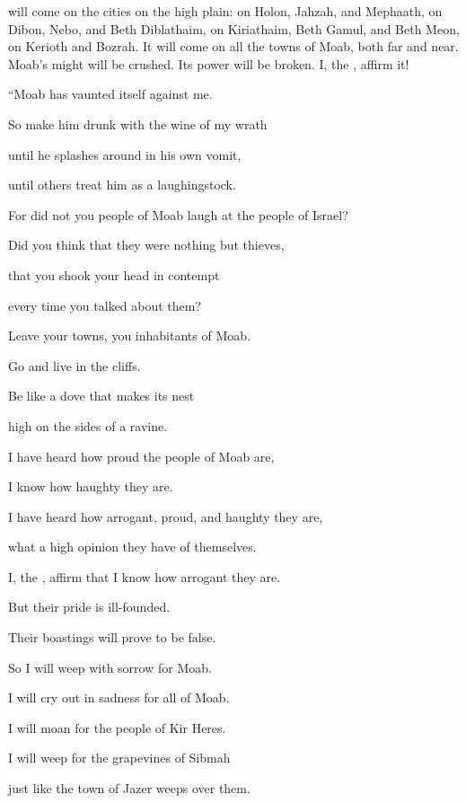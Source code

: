 {will come
on
the cities on the high plain: on Holon,
Jahzah,
and Mephaath,
on
Dibon,
Nebo,
and Beth Diblathaim,
on
Kiriathaim,
Beth Gamul,
and Beth Meon,
on
Kerioth
and Bozrah.
It will come on
all
the towns
of Moab,
both far
and near.
Moab’s
might will be crushed.
Its
power
will be broken.
I, the
{}, affirm it!
\par }{\Q {}“Moab
has vaunted
itself against
me.
\par }{\Q So make him drunk with the wine of my wrath
\par }{\Q until he splashes
around in his own vomit,
\par }{\Q until others treat him as
a laughingstock.
\par }{\Q {}For did not
you people of Moab laugh
at the people of Israel?
\par }{\Q Did you think that they were nothing but thieves,

\par }{\Q that
you shook your head in contempt
\par }{\Q every time you talked about them?
\par }{\Q {}Leave
your towns,
you inhabitants
of Moab.
\par }{\Q Go
and live
in the cliffs.
\par }{\Q Be
like a dove
that makes its nest
\par }{\Q high
on
the sides
of a ravine.
\par }{\Q {}I have heard
how proud
the people of Moab
are,
\par }{\Q I know how
haughty
they are.
\par }{\Q I have heard how arrogant,
proud,
and haughty
they are,
\par }{\Q what a high
opinion they have of themselves.
\par }{\Q {}I,
the {}, affirm
that
I know
how arrogant they are.
\par }{\Q But their pride is ill-founded.
\par }{\Q Their boastings will prove to be false.
\par }{\Q {}So
I will weep with sorrow
for
Moab.
\par }{\Q I will cry out
in sadness for all
of Moab.
\par }{\Q I will moan
for
the people
of Kir Heres.
\par }{\Q {}I will weep
for the grapevines
of Sibmah
\par }{\Q just like the town of Jazer
weeps
over them.

}
